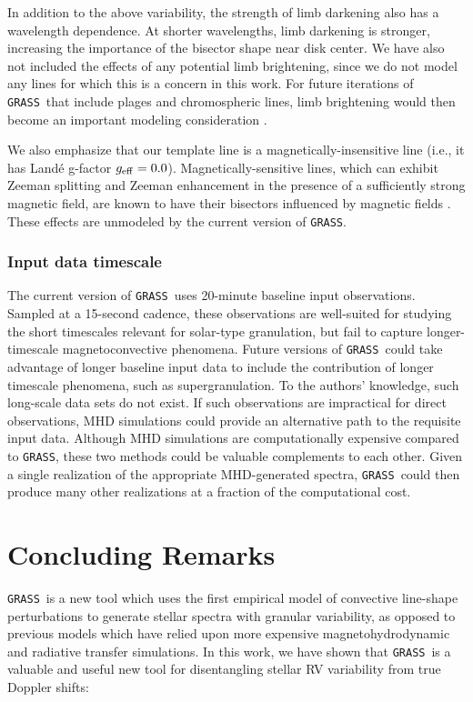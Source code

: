 \documentclass[twocolumn]{aastex63}
\newcommand{\grass}{\texttt{GRASS}}
\begin{document}
In addition to the above variability, the strength of limb darkening also has a wavelength dependence. At shorter wavelengths, limb darkening is stronger, increasing the importance of the bisector shape near disk center. We have also not included the effects of any potential limb brightening, since we do not model any lines for which this is a concern in this work. For future iterations of \grass\ that include plages and chromospheric lines, limb brightening would then become an important modeling consideration \citep{Meunier2010, Dumusque2014}. \par 

We also emphasize that our template line is a magnetically-insensitive line (i.e., it has Land{\'e} g-factor $g_{\rm eff} = 0.0$). Magnetically-sensitive lines, which can exhibit Zeeman splitting and Zeeman enhancement in the presence of a sufficiently strong magnetic field, are known to have their bisectors influenced by magnetic fields \citep[e.g.,][]{Cavallini1988, Brandt1990}. These effects are unmodeled by the current version of \grass. \par

\subsubsection{Input data timescale} \label{subsubsec:timescale}

The current version of \grass\ uses 20-minute baseline input observations. Sampled at a 15-second cadence, these observations are well-suited for studying the short timescales relevant for solar-type granulation, but fail to capture longer-timescale magnetoconvective phenomena. Future versions of \grass\ could take advantage of longer baseline input data to include the contribution of longer timescale phenomena, such as supergranulation. To the authors' knowledge, such long-scale data sets do not exist. If such observations are impractical for direct observations, MHD simulations could provide an alternative path to the requisite input data. Although MHD simulations are computationally expensive compared to \grass, these two methods could be valuable complements to each other. Given a single realization of the appropriate MHD-generated spectra, \grass\ could then produce many other realizations at a fraction of the computational cost. \par

\section{Concluding Remarks}
\grass\ is a new tool which uses the first empirical model of convective line-shape perturbations to generate stellar spectra with granular variability, as opposed to previous models which have relied upon more expensive magnetohydrodynamic and radiative transfer simulations. In this work, we have shown that \grass\  is a valuable and useful new tool for disentangling stellar RV variability from true Doppler shifts:
\end{document}
